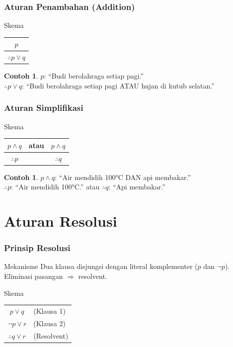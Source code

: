 \documentclass[handout]{beamer}
\theoremstyle{definition}
\theoremstyle{example}
\newtheorem{contoh}[theorem]{Contoh}
\begin{document}
\begin{frame}
\frametitle{Aturan Penambahan (Addition)}
\begin{block}{Skema}
\begin{tabular}{c}
$p$ \\
\hline
$\therefore p \vee q$
\end{tabular}
\end{block}
\begin{contoh}
$p$: ``Budi berolahraga setiap pagi.''\\
$\therefore p \vee q$: ``Budi berolahraga setiap pagi ATAU hujan di kutub selatan.''
\end{contoh}
\end{frame}

\begin{frame}
\frametitle{Aturan Simplifikasi}
\begin{block}{Skema}
\begin{tabular}{ccc}
$p \wedge q$ & \quad atau \quad & $p \wedge q$ \\
\hline
$\therefore p$ & & $\therefore q$
\end{tabular}
\end{block}
\begin{contoh}
$p \wedge q$: ``Air mendidih 100°C DAN api membakar.''\\
$\therefore p$: ``Air mendidih 100°C.'' \quad atau \quad $\therefore q$: ``Api membakar.''
\end{contoh}
\end{frame}

\section{Aturan Resolusi}

\begin{frame}
\frametitle{Prinsip Resolusi}
\begin{block}{Mekanisme}
Dua klausa disjungsi dengan literal komplementer ($p$ dan $\neg p$). Eliminasi pasangan $\Rightarrow$ resolvent.
\end{block}
\begin{block}{Skema}
\begin{tabular}{cl}
$p \vee q$ & (Klausa 1) \\
$\neg p \vee r$ & (Klausa 2) \\
\hline
$\therefore q \vee r$ & (Resolvent)
\end{tabular}
\end{block}
\end{frame}
\end{document}
